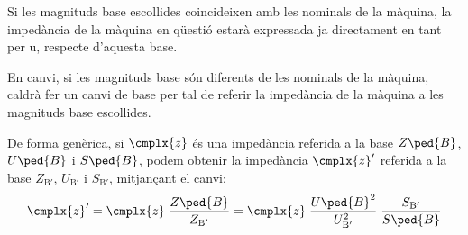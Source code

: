 Si les magnituds base escollides coincideixen amb les nominals de la màquina,
la impedància de la màquina en qüestió estarà expressada ja directament en tant per u, respecte d'aquesta base.

 En canvi, si les magnituds base són diferents de les nominals de la màquina, caldrà fer un canvi de base per tal de referir la impedància de la màquina a les magnituds base escollides.

De forma genèrica, si $\cmplx{z}$ és una impedància referida a la base $Z\ped{B}$, $U\ped{B}$ i $S\ped{B}$, podem obtenir la impedància $\cmplx{z}'$ referida a la base $Z_{\text{B}'}$, $U_{\text{B}'}$ i $S_{\text{B}'}$, mitjançant el canvi:
\begin{equation}
   \cmplx{z}' = \cmplx{z} \; \frac{Z\ped{B}}{Z_{\text{B}'}} = \cmplx{z} \; \frac{U\ped{B}^2}{U_{\text{B}'}^2} \; \frac{S_{\text{B}'}}{S\ped{B}}\label{eq_pu_canvi_base}
\end{equation}


